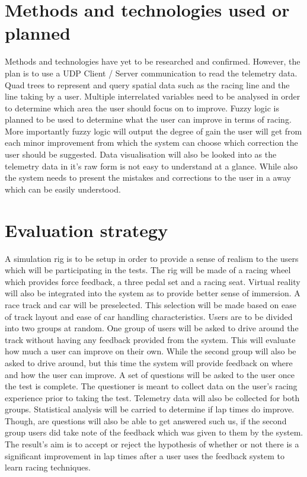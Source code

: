 \documentclass{article}
\begin{document}
\section{Methods and technologies used or planned}

Methods and technologies have yet to be researched and confirmed. However, the plan is to use a
UDP Client / Server communication to read the telemetry data. Quad trees to represent and query spatial data such as the racing line and the line taking by a user. Multiple interrelated variables need to be analysed in order to determine which area the user should focus on to improve. Fuzzy logic is planned to be used to determine what the user can improve in terms of racing. More importantly fuzzy logic will output the degree of gain the user will get from each minor improvement from which the system can choose which correction the user should be suggested. Data visualisation will also be looked into as the telemetry data in it’s raw form is not easy to understand at a glance. While also the system needs to present the mistakes and corrections to the user in a away which can be easily understood. 

\section{Evaluation strategy}

A simulation rig is to be setup in order to provide a sense of realism to the users which will be participating in the tests. The rig will be made of a racing wheel which provides force feedback, a three pedal set and a racing seat. Virtual reality will also be integrated into the system as to provide better sense of immersion. A race track and car will be preselected. This selection will be made based on ease of track layout and ease of car handling characteristics. Users are to be divided into two groups at random. One group of users will be asked to drive around the track without having any feedback provided from the system. This will evaluate how much a user can improve on their own. While the second group will also be asked to drive around, but this time the system will provide feedback on where and how the user can improve. A set of questions will be asked to the user once the test is complete. The questioner is meant to collect data on the user’s racing experience prior to taking the test. Telemetry data will also be collected for both groups. Statistical analysis will be carried to determine if lap times do improve. Though, are questions will also be able to get answered such us, if the second group users did take note of the feedback which was given to them by the system.
The result’s aim is to accept or reject the hypothesis of whether or not there is a significant improvement in lap times after a user uses the feedback system to learn racing techniques. 
\end{document}

